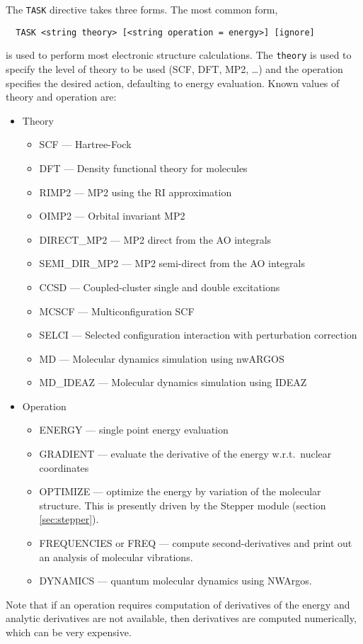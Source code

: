 The \verb+TASK+ directive takes three forms.  The most common form,
\begin{verbatim}
  TASK <string theory> [<string operation = energy>] [ignore]
\end{verbatim}
is used to perform most electronic structure calculations.  The
\verb+theory+ is used to specify the level of theory to be used (SCF,
DFT, MP2, \ldots) and the operation specifies the desired action,
defaulting to energy evaluation.  Known values of theory and operation
are:
\begin{itemize}
\item Theory \newline
\begin{itemize}
 \item SCF --- Hartree-Fock
 \item DFT --- Density functional theory for molecules
 \item RIMP2 --- MP2 using the RI approximation
 \item OIMP2 --- Orbital invariant MP2
 \item DIRECT\_MP2 --- MP2 direct from the AO integrals
 \item SEMI\_DIR\_MP2 --- MP2 semi-direct from the AO integrals
 \item CCSD --- Coupled-cluster single and double excitations
 \item MCSCF --- Multiconfiguration SCF
 \item SELCI --- Selected configuration interaction with perturbation
   correction 
 \item MD --- Molecular dynamics simulation using nwARGOS
 \item MD_IDEAZ --- Molecular dynamics simulation using IDEAZ
\end{itemize}
\item Operation \newline
\begin{itemize}
 \item ENERGY --- single point energy evaluation
 \item GRADIENT --- evaluate the derivative of the energy w.r.t.\
   nuclear coordinates
 \item OPTIMIZE --- optimize the energy by variation of the molecular
   structure.  This is presently driven by the Stepper module
   (section \ref{sec:stepper}). 
 \item FREQUENCIES or FREQ --- compute second-derivatives and print
   out an analysis of molecular vibrations.
 \item DYNAMICS --- quantum molecular dynamics using NWArgos.
\end{itemize} 
\end{itemize}
Note that if an operation requires computation of derivatives of the
energy and analytic derivatives are not available, then derivatives
are computed numerically, which can be very expensive.

